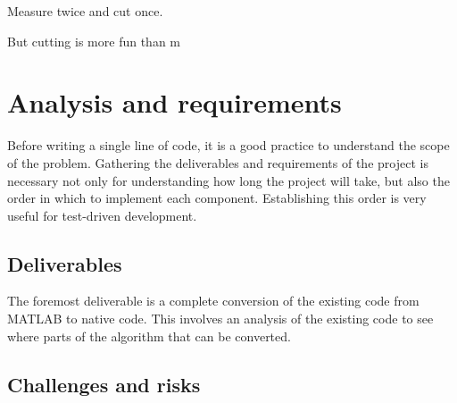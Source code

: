 \begin{savequote}[0.55\linewidth]
	\begin{fancyquote}
		Measure twice and cut once.
	\end{fancyquote}

	\begin{fancyquote}
		But cut\hspace{1em}ting is more fun than m\hspace{0.5em}\raisebox{-0.1em}{eas}\hspace{0.5em}\raisebox{-0.3em}{uri}\hspace{0.5em}\raisebox{-0.5em}{ng!}
	\end{fancyquote}
\end{savequote}

\chapter{Analysis and requirements}\label{ch:analysis}

Before writing a single line of code, it is a good practice to understand the
scope of the problem. Gathering the deliverables and requirements of the
project is necessary not only for understanding how long the project will take,
but also the order in which to implement each component. Establishing this
order is very useful for test-driven development.

\section{Deliverables}\label{sec:deliverables}

The foremost deliverable is a complete conversion of the existing
code from MATLAB to native code. This involves an analysis of the
existing code to see where parts of the algorithm that can be
converted.



\section{Challenges and risks}


